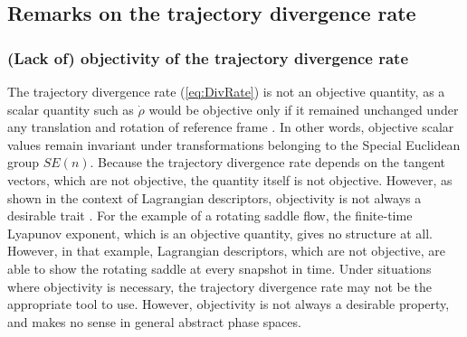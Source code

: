 \documentclass[twocolumn]{svjour3}
\begin{document}
\subsection{Remarks on the trajectory divergence rate}

\subsubsection{(Lack of) objectivity of the trajectory divergence rate}
The trajectory divergence rate (\ref{eq:DivRate}) is not an objective quantity, as a scalar quantity such as $\dot{\rho}$ would be objective only if it remained unchanged under any translation and rotation of reference frame \cite{truesdell2004non,serra_objective_2016}. In other words, objective scalar values remain invariant under transformations belonging to the Special Euclidean group $SE(n)$. Because the trajectory divergence rate depends on the tangent vectors, which are not objective, the quantity itself is not objective. However, as shown in the context of Lagrangian descriptors, objectivity is not always a desirable trait \cite{lopesino2017theoretical}. For the example of a rotating saddle flow, the finite-time Lyapunov exponent, which is an objective quantity, gives no structure at all. However, in that example, Lagrangian descriptors, which are not objective, are able to show the rotating saddle at every snapshot in time. Under situations where objectivity is necessary, the trajectory divergence rate may not be the appropriate tool to use. However, objectivity is not always a desirable property, and makes no sense in general abstract phase spaces.
\end{document}
